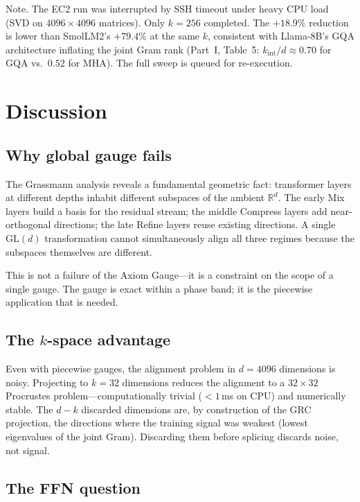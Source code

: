 \documentclass[11pt]{article}
\begin{document}
Note.  The EC2 run was interrupted by SSH timeout under heavy
CPU load (SVD on $4096\times4096$ matrices).  Only $k{=}256$ completed.
The $+18.9\%$ reduction is lower than SmolLM2's $+79.4\%$ at the same
$k$, consistent with Llama-8B's GQA architecture inflating the joint
Gram rank (Part~I, Table~5: $k_{\mathrm{int}}/d \approx 0.70$ for GQA
vs.\ $0.52$ for MHA).  The full sweep is queued for re-execution.

\section{Discussion}
\label{sec:discussion}

\subsection{Why global gauge fails}

The Grassmann analysis reveals a fundamental geometric fact:
transformer layers at different depths inhabit different subspaces
of the ambient $\mathbb{R}^d$.  The early Mix layers build a basis for
the residual stream; the middle Compress layers add near-orthogonal
directions; the late Refine layers reuse existing directions.  A single
$\mathrm{GL}(d)$ transformation cannot simultaneously align all three
regimes because the subspaces themselves are different.

This is not a failure of the Axiom Gauge---it is a constraint on the
scope of a single gauge.  The gauge is exact within a phase band;
it is the piecewise application that is needed.

\subsection{The $k$-space advantage}

Even with piecewise gauges, the alignment problem in $d{=}4096$
dimensions is noisy.  Projecting to $k{=}32$ dimensions reduces the
alignment to a $32\times32$ Procrustes problem---computationally
trivial ($<1$\,ms on CPU) and numerically stable.  The $d-k$ discarded
dimensions are, by construction of the GRC projection, the directions
where the training signal was weakest (lowest eigenvalues of the
joint Gram).  Discarding them before splicing discards noise, not
signal.

\subsection{The FFN question}
\end{document}
